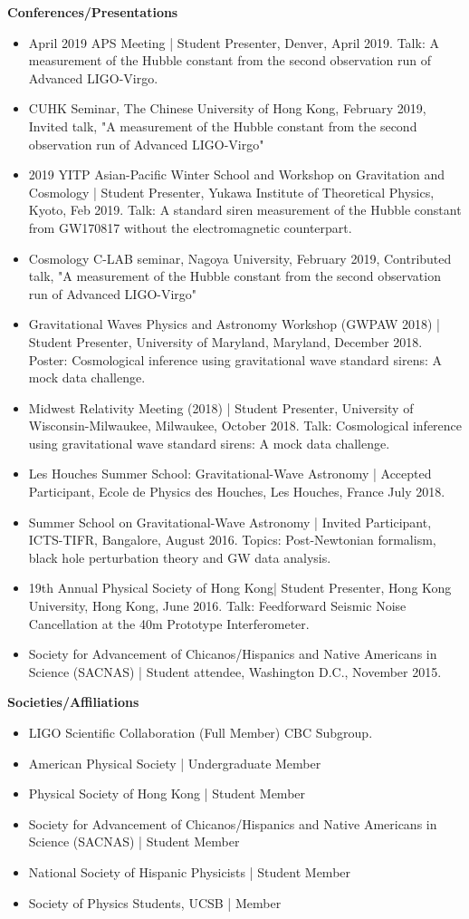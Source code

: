 \documentclass[letterpaper,10pt]{article}
\newcommand{\resheading}[1]{{\large \colorbox{mygrey}{\begin{minipage}{\textwidth}{\textbf{#1 \vphantom{p\^{E}}}}\end{minipage}}}}
\begin{document}
\resheading{Conferences/Presentations}
\begin{itemize}
    \item April 2019 APS Meeting | Student Presenter, Denver, April 2019. Talk:  A measurement of the Hubble constant from the second observation run of Advanced LIGO-Virgo.
    \item CUHK Seminar, The Chinese University of Hong Kong, February 2019, Invited talk, "A measurement of the Hubble constant from the second observation run of Advanced LIGO-Virgo"
    \item 2019 YITP Asian-Pacific Winter School and Workshop on Gravitation and Cosmology | Student Presenter, Yukawa Institute of Theoretical Physics, Kyoto, Feb 2019. Talk: A standard siren measurement of the Hubble constant from GW170817 without the electromagnetic counterpart.
    \item Cosmology C-LAB seminar, Nagoya University, February 2019, Contributed talk, "A measurement of the Hubble constant from the second observation run of Advanced LIGO-Virgo"
    \item Gravitational Waves Physics and Astronomy Workshop (GWPAW 2018) | Student Presenter, University of Maryland, Maryland, December 2018. Poster: Cosmological inference using gravitational wave standard sirens: A mock data challenge.
    \item Midwest Relativity Meeting (2018) | Student Presenter, University of Wisconsin-Milwaukee, Milwaukee, October 2018. Talk: Cosmological inference using gravitational wave standard sirens: A mock data challenge.
    \item Les Houches Summer School: Gravitational-Wave Astronomy | Accepted Participant, Ecole de Physics des Houches, Les Houches, France July 2018.
	\item Summer School on Gravitational-Wave Astronomy | Invited Participant, ICTS-TIFR, Bangalore, August 2016. Topics: Post-Newtonian formalism, black hole perturbation theory and GW data analysis.
	\item 19th Annual Physical Society of Hong Kong| Student Presenter, Hong Kong University, Hong Kong, June 2016. Talk: Feedforward Seismic Noise Cancellation at the 40m Prototype Interferometer.
	\item Society for Advancement of Chicanos/Hispanics and Native Americans in Science (SACNAS) | Student attendee, Washington D.C., November 2015.
\end{itemize}

\resheading{Societies/Affiliations}
\begin{itemize}
	\item LIGO Scientific Collaboration (Full Member) CBC Subgroup.
	\item American Physical Society | Undergraduate Member
	\item Physical Society of Hong Kong | Student Member
	\item Society for Advancement of Chicanos/Hispanics and Native Americans in Science (SACNAS) | Student Member
	\item National Society of Hispanic Physicists | Student Member
	\item Society of Physics Students, UCSB | Member
\end{itemize}
\end{document}
